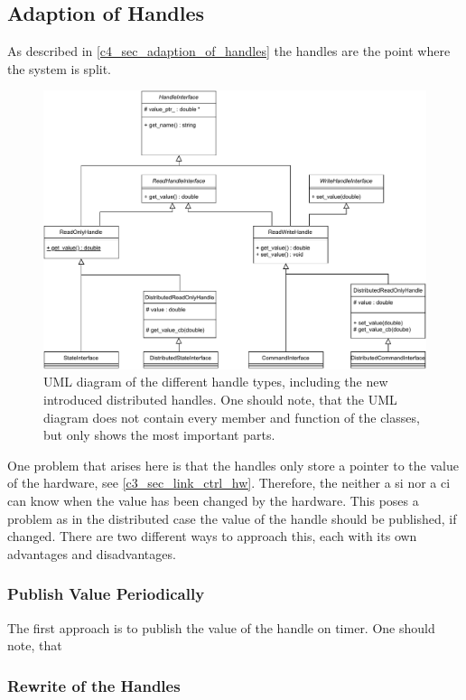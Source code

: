 \subsection{Adaption of Handles}
As described in \autoref{c4_sec_adaption_of_handles} the \glspl{handle} are the point where the system is split. 
\begin{figure}[htbp]
	\centering
	\includegraphics[width=1\textwidth]{Figures/c5/Handles_UML.pdf}
	\caption{UML diagram of the different \gls{handle} types, including the new introduced distributed \glspl{handle}. One should note, that the UML diagram does not contain every member and function of the classes, but only shows the most important parts. }
	\label{c5_fig_handle_uml}
\end{figure}


One problem that arises here is that the \glspl{handle} only store a pointer to the value of the hardware, see \autoref{c3_sec_link_ctrl_hw}. Therefore, the neither a \gls{si} nor a \gls{ci} can know when the value has been changed by the hardware. This poses a problem as in the distributed case the value of the \gls{handle} should be published, if changed. There are two different ways to approach this, each with its own advantages and disadvantages.
\subsubsection*{Publish Value Periodically}
The first approach is to publish the value of the \gls{handle} on timer. One should note, that 
\subsubsection*{Rewrite of the Handles}
